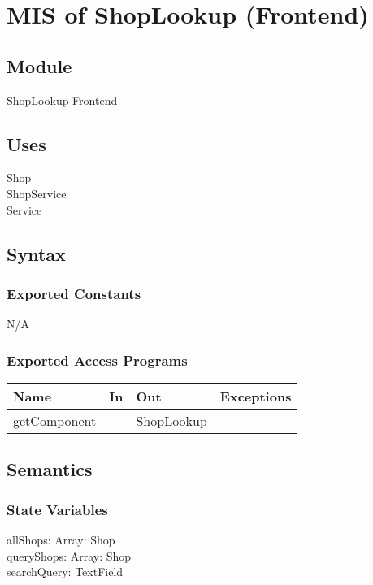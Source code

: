 \documentclass[12pt, titlepage]{article}
\begin{document}
\newpage

\section{MIS of ShopLookup (Frontend)} \label{Module}

\subsection{Module}
ShopLookup Frontend

\subsection{Uses}
Shop\\
ShopService\\
Service

\subsection{Syntax}

\subsubsection{Exported Constants}
N/A

\subsubsection{Exported Access Programs}

\begin{center}
    \begin{tabular}{p{2cm} p{4cm} p{4cm} p{2cm}}
    \hline
    \textbf{Name} & \textbf{In} & \textbf{Out} & \textbf{Exceptions} \\
    \hline
    getComponent & - & ShopLookup & - \\
    \hline
    \end{tabular}
\end{center}

\subsection{Semantics}

\subsubsection{State Variables}

allShops: Array: Shop \\
queryShops: Array: Shop \\
searchQuery: TextField \\
\end{document}
